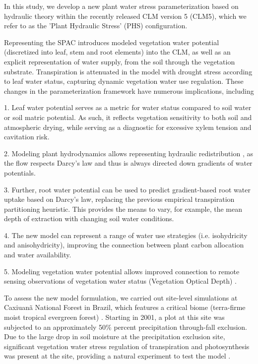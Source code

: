 \documentclass[draft,linenumbers]{agujournal}
\begin{document}
In this study, we develop a new plant water stress parameterization based on hydraulic theory within the recently released CLM version 5 (CLM5), which we refer to as the 'Plant Hydraulic Stress' (PHS) configuration. 

Representing the SPAC introduces modeled vegetation water potential (discretized into leaf, stem and root elements) into the CLM, as well as an explicit representation of water supply, from the soil through the vegetation substrate. 
Transpiration is attenuated in the model with drought stress according to leaf water status, capturing dynamic vegetation water use regulation. 
These changes in the parameterization framework have numerous implications, including 

1. Leaf water potential serves as a metric for water status compared to soil water or soil matric potential. As such, it reflects vegetation sensitivity to both soil and atmospheric drying, while serving as a diagnostic for excessive xylem tension and cavitation risk. 

2. Modeling plant hydrodynamics allows representing hydraulic redistribution \citep{lee2005}, as the flow respects Darcy's law and thus is always directed down gradients of water potentials. 

3. Further, root water potential can be used to predict gradient-based root water uptake based on Darcy's law, replacing the previous empirical transpiration partitioning heuristic. This provides the means to vary, for example, the mean depth of extraction with changing soil water conditions.

4. The new model can represent a range of water use strategies (i.e. isohydricity and anisohydricity), improving the connection between plant carbon allocation and water availability.

5. Modeling vegetation water potential allows improved connection to remote sensing observations of vegetation water status (Vegetation Optical Depth) \citep{konings2016}. 

To assess the new model formulation, we carried out site-level simulations at Caxiuan\~a National Forest in Brazil, which features a critical biome (terra-firme moist tropical evergreen forest) \citep{fisher2006}.  Starting in 2001, a plot at this site was subjected to an approximately 50\% percent precipitation through-fall exclusion. Due to the large drop in soil moisture at the precipitation exclusion site, significant vegetation water stress regulation of transpiration and photosynthesis was present at the site, providing a natural experiment to test the model \citep{fisher2007}.
\end{document}
